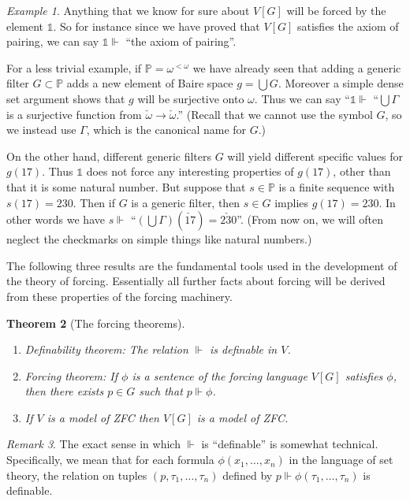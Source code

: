 \documentclass[11pt,oneside]{amsbook}
\newcommand{\forces}{\Vdash}
\theoremstyle{definition}
\theoremstyle{plain}
\newtheorem{thm}{Theorem}[section]
\theoremstyle{definition}
\theoremstyle{remark}
\newtheorem{rem}[thm]{Remark}
\newtheorem{example}[thm]{Example}
\begin{document}
\begin{example}
  Anything that we know for sure about $V[G]$ will be forced by the element $\mathbb 1$. So for instance since we have proved that $V[G]$ satisfies the axiom of pairing, we can say $\mathbb 1\forces$ ``the axiom of pairing''.

  For a less trivial example, if $\mathbb P=\omega^{<\omega}$ we have already seen that adding a generic filter $G\subset\mathbb P$ adds a new element of Baire space $g=\bigcup G$. Moreover a simple dense set argument shows that $g$ will be surjective onto $\omega$. Thus we can say ``$\mathbb 1\forces$ ``$\bigcup\Gamma$ is a surjective function from $\check\omega\to\check\omega$.'' (Recall that we cannot use the symbol $G$, so we instead use $\Gamma$, which is the canonical name for $G$.)

  On the other hand, different generic filters $G$ will yield different specific values for $g(17)$. Thus $\mathbb 1$ does not force any interesting properties of $g(17)$, other than that it is some natural number. But suppose that $s\in\mathbb P$ is a finite sequence with $s(17)=230$. Then if $G$ is a generic filter, then $s\in G$ implies $g(17)=230$. In other words we have $s\forces$ ``$(\bigcup\Gamma)(\check{17})=\check{230}$''. (From now on, we will often neglect the checkmarks on simple things like natural numbers.)
\end{example}

The following three results are the fundamental tools used in the development of the theory of forcing. Essentially all further facts about forcing will be derived from these properties of the forcing machinery.

\begin{thm}[The forcing theorems]\
\label{thm:forcing}
\begin{enumerate}
\item \textup{Definability theorem}: The relation $\forces$ is definable in $V$.
\item \textup{Forcing theorem}: If $\phi$ is a sentence of the forcing language $V[G]$ satisfies $\phi$, then there exists $p\in G$ such that $p\forces\phi$.
\item If $V$ is a model of ZFC then $V[G]$ is a model of ZFC.
\end{enumerate}
\end{thm}

\begin{rem}
  The exact sense in which $\forces$ is ``definable'' is somewhat technical. Specifically, we mean that for each formula $\phi(x_1,\ldots,x_n)$ in the language of set theory, the relation on tuples $(p,\tau_1,\ldots,\tau_n)$ defined by $p\forces\phi(\tau_1,\ldots,\tau_n)$ is definable.
\end{rem}
\end{document}
